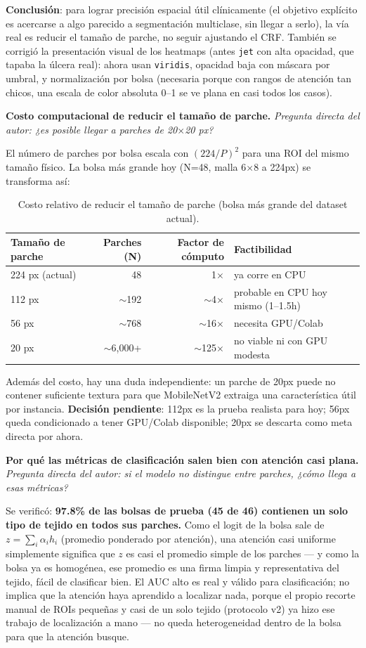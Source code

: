 \documentclass[12pt,letterpaper]{report}
\newcommand{\entrada}[2]{%
    \vspace{0.6em}
    \noindent\textbf{#1.} \textit{#2}
    \vspace{0.3em}
    \par
}
\begin{document}
\textbf{Conclusión}: para lograr precisión espacial útil clínicamente (el objetivo explícito es
acercarse a algo parecido a segmentación multiclase, sin llegar a serlo), la vía real es reducir el
tamaño de parche, no seguir ajustando el CRF. También se corrigió la presentación visual de los
heatmaps (antes \texttt{jet} con alta opacidad, que tapaba la úlcera real): ahora usan
\texttt{viridis}, opacidad baja con máscara por umbral, y normalización por bolsa (necesaria porque
con rangos de atención tan chicos, una escala de color absoluta 0--1 se ve plana en casi todos los
casos).

\entrada{Costo computacional de reducir el tamaño de parche}{Pregunta directa del autor: ¿es posible
llegar a parches de 20$\times$20 px?}

El número de parches por bolsa escala con $(224/P)^2$ para una ROI del mismo tamaño físico. La
bolsa más grande hoy (N=48, malla 6$\times$8 a 224px) se transforma así:

\begin{table}[H]
\centering
\caption{Costo relativo de reducir el tamaño de parche (bolsa más grande del dataset actual).}
\begin{tabular}{lrrl}
\toprule
Tamaño de parche & Parches (N) & Factor de cómputo & Factibilidad \\
\midrule
224 px (actual) & 48 & 1$\times$ & ya corre en CPU \\
112 px & $\sim$192 & $\sim$4$\times$ & probable en CPU hoy mismo (1--1.5h) \\
56 px & $\sim$768 & $\sim$16$\times$ & necesita GPU/Colab \\
20 px & $\sim$6{,}000+ & $\sim$125$\times$ & no viable ni con GPU modesta \\
\bottomrule
\end{tabular}
\end{table}

Además del costo, hay una duda independiente: un parche de 20px puede no contener suficiente
textura para que MobileNetV2 extraiga una característica útil por instancia. \textbf{Decisión
pendiente}: 112px es la prueba realista para hoy; 56px queda condicionado a tener GPU/Colab
disponible; 20px se descarta como meta directa por ahora.

\entrada{Por qué las métricas de clasificación salen bien con atención casi plana}{Pregunta directa
del autor: si el modelo no distingue entre parches, ¿cómo llega a esas métricas?}

Se verificó: \textbf{97.8\% de las bolsas de prueba (45 de 46) contienen un solo tipo de tejido en
todos sus parches.} Como el logit de la bolsa sale de $z = \sum_i \alpha_i h_i$ (promedio ponderado
por atención), una atención casi uniforme simplemente significa que $z$ es casi el promedio simple
de los parches --- y como la bolsa ya es homogénea, ese promedio es una firma limpia y
representativa del tejido, fácil de clasificar bien. El AUC alto es real y válido para
clasificación; no implica que la atención haya aprendido a localizar nada, porque el propio recorte
manual de ROIs pequeñas y casi de un solo tejido (protocolo v2) ya hizo ese trabajo de localización
a mano --- no queda heterogeneidad dentro de la bolsa para que la atención busque.
\end{document}
